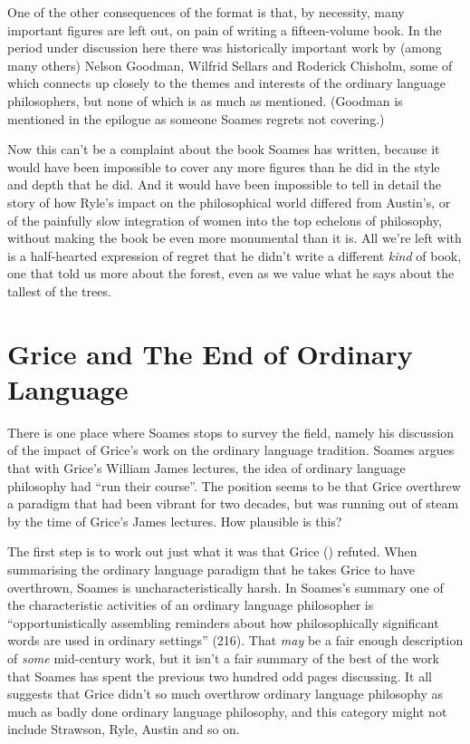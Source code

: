 \documentclass[
  11pt,
  letterpaper,
  DIV=11,
  numbers=noendperiod,
  twoside]{scrartcl}
\begin{document}
One of the other consequences of the format is that, by necessity, many
important figures are left out, on pain of writing a fifteen-volume
book. In the period under discussion here there was historically
important work by (among many others) Nelson Goodman, Wilfrid Sellars
and Roderick Chisholm, some of which connects up closely to the themes
and interests of the ordinary language philosophers, but none of which
is as much as mentioned. (Goodman is mentioned in the epilogue as
someone Soames regrets not covering.)

Now this can't be a complaint about the book Soames has written, because
it would have been impossible to cover any more figures than he did in
the style and depth that he did. And it would have been impossible to
tell in detail the story of how Ryle's impact on the philosophical world
differed from Austin's, or of the painfully slow integration of women
into the top echelons of philosophy, without making the book be even
more monumental than it is. All we're left with is a half-hearted
expression of regret that he didn't write a different \emph{kind} of
book, one that told us more about the forest, even as we value what he
says about the tallest of the trees.

\section{Grice and The End of Ordinary
Language}\label{grice-and-the-end-of-ordinary-language}

There is one place where Soames stops to survey the field, namely his
discussion of the impact of Grice's work on the ordinary language
tradition. Soames argues that with Grice's William James lectures, the
idea of ordinary language philosophy had ``run their course''. The
position seems to be that Grice overthrew a paradigm that had been
vibrant for two decades, but was running out of steam by the time of
Grice's James lectures. How plausible is this?

The first step is to work out just what it was that Grice
() refuted. When summarising the ordinary
language paradigm that he takes Grice to have overthrown, Soames is
uncharacteristically harsh. In Soames's summary one of the
characteristic activities of an ordinary language philosopher is
``opportunistically assembling reminders about how philosophically
significant words are used in ordinary settings'' (216). That \emph{may}
be a fair enough description of \emph{some} mid-century work, but it
isn't a fair summary of the best of the work that Soames has spent the
previous two hundred odd pages discussing. It all suggests that Grice
didn't so much overthrow ordinary language philosophy as much as badly
done ordinary language philosophy, and this category might not include
Strawson, Ryle, Austin and so on.
\end{document}
